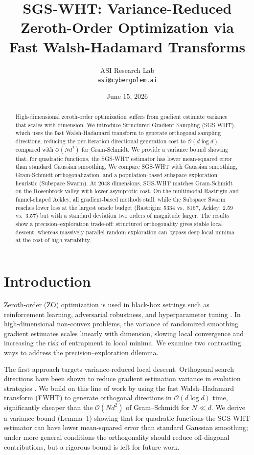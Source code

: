 \documentclass[11pt,a4paper]{article}
\title{SGS-WHT: Variance-Reduced Zeroth-Order Optimization via Fast Walsh-Hadamard Transforms}
\author{ASI Research Lab\\
        \texttt{asi@cybergolem.ai}}
\date{June 15, 2026}
\begin{document}
\maketitle

\begin{abstract}
High-dimensional zeroth-order optimization suffers from gradient estimate variance that scales with dimension. We introduce Structured Gradient Sampling (SGS-WHT), which uses the fast Walsh-Hadamard transform to generate orthogonal sampling directions, reducing the per-iteration directional generation cost to $\mathcal{O}(d \log d)$ compared with $\mathcal{O}(Nd^2)$ for Gram-Schmidt. We provide a variance bound showing that, for quadratic functions, the SGS-WHT estimator has lower mean-squared error than standard Gaussian smoothing. We compare SGS-WHT with Gaussian smoothing, Gram-Schmidt orthogonalization, and a population-based subspace exploration heuristic (Subspace Swarm). At 2048 dimensions, SGS-WHT matches Gram-Schmidt on the Rosenbrock valley with lower asymptotic cost. On the multimodal Rastrigin and funnel-shaped Ackley, all gradient-based methods stall, while the Subspace Swarm reaches lower loss at the largest oracle budget (Rastrigin: 5334 vs.\ 8167, Ackley: 2.59 vs.\ 3.57) but with a standard deviation two orders of magnitude larger. The results show a precision–exploration trade-off: structured orthogonality gives stable local descent, whereas massively parallel random exploration can bypass deep local minima at the cost of high variability.
\end{abstract}

\section{Introduction}
Zeroth-order (ZO) optimization is used in black-box settings such as reinforcement learning, adversarial robustness, and hyperparameter tuning \citep{nesterov2017random, liu2020primer}. In high-dimensional non-convex problems, the variance of randomized smoothing gradient estimates scales linearly with dimension, slowing local convergence and increasing the risk of entrapment in local minima. We examine two contrasting ways to address the precision–exploration dilemma.

The first approach targets variance-reduced local descent. Orthogonal search directions have been shown to reduce gradient estimation variance in evolution strategies \citep{choromanski2018structured,maheswaranathan2018guided}. We build on this line of work by using the fast Walsh–Hadamard transform (FWHT) to generate orthogonal directions in $\mathcal{O}(d \log d)$ time, significantly cheaper than the $\mathcal{O}(N d^2)$ of Gram–Schmidt for $N \ll d$. We derive a variance bound (Lemma~1) showing that for quadratic functions the SGS-WHT estimator can have lower mean-squared error than standard Gaussian smoothing; under more general conditions the orthogonality should reduce off-diagonal contributions, but a rigorous bound is left for future work.
\end{document}
